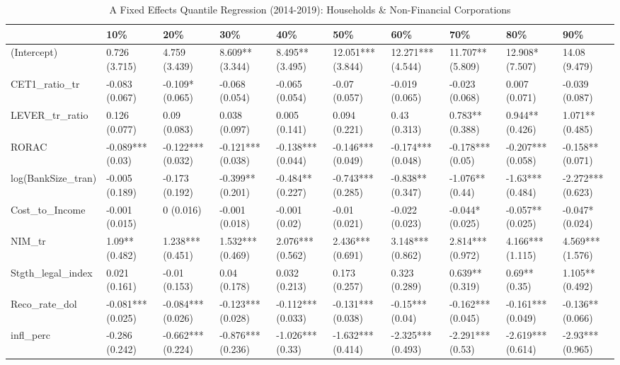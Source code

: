 \begin{table}[ht]
\centering
\caption{A Fixed Effects Quantile Regression (2014-2019): Households & Non-Financial Corporations} 
\begingroup\small
\begin{tabular}{llllllllll}
  \toprule
 & 10\% & 20\% & 30\% & 40\% & 50\% & 60\% & 70\% & 80\% & 90\% \\ 
  \midrule
(Intercept) & 0.726 (3.715) & 4.759 (3.439) & 8.609** (3.344) & 8.495** (3.495) & 12.051*** (3.844) & 12.271*** (4.544) & 11.707** (5.809) & 12.908* (7.507) & 14.08 (9.479) \\ 
  CET1\_ratio\_tr & -0.083 (0.067) & -0.109* (0.065) & -0.068 (0.054) & -0.065 (0.054) & -0.07 (0.057) & -0.019 (0.065) & -0.023 (0.068) & 0.007 (0.071) & -0.039 (0.087) \\ 
  LEVER\_tr\_ratio & 0.126 (0.077) & 0.09 (0.083) & 0.038 (0.097) & 0.005 (0.141) & 0.094 (0.221) & 0.43 (0.313) & 0.783** (0.388) & 0.944** (0.426) & 1.071** (0.485) \\ 
  RORAC & -0.089*** (0.03) & -0.122*** (0.032) & -0.121*** (0.038) & -0.138*** (0.044) & -0.146*** (0.049) & -0.174*** (0.048) & -0.178*** (0.05) & -0.207*** (0.058) & -0.158** (0.071) \\ 
  log(BankSize\_tran) & -0.005 (0.189) & -0.173 (0.192) & -0.399** (0.201) & -0.484** (0.227) & -0.743*** (0.285) & -0.838** (0.347) & -1.076** (0.44) & -1.63*** (0.484) & -2.272*** (0.623) \\ 
  Cost\_to\_Income & -0.001 (0.015) & 0 (0.016) & -0.001 (0.018) & -0.001 (0.02) & -0.01 (0.021) & -0.022 (0.023) & -0.044* (0.025) & -0.057** (0.025) & -0.047* (0.024) \\ 
  NIM\_tr & 1.09** (0.482) & 1.238*** (0.451) & 1.532*** (0.469) & 2.076*** (0.562) & 2.436*** (0.691) & 3.148*** (0.862) & 2.814*** (0.972) & 4.166*** (1.115) & 4.569*** (1.576) \\ 
  Stgth\_legal\_index & 0.021 (0.161) & -0.01 (0.153) & 0.04 (0.178) & 0.032 (0.213) & 0.173 (0.257) & 0.323 (0.289) & 0.639** (0.319) & 0.69** (0.35) & 1.105** (0.492) \\ 
  Reco\_rate\_dol & -0.081*** (0.025) & -0.084*** (0.026) & -0.123*** (0.028) & -0.112*** (0.033) & -0.131*** (0.038) & -0.15*** (0.04) & -0.162*** (0.045) & -0.161*** (0.049) & -0.136** (0.066) \\ 
  infl\_perc & -0.286 (0.242) & -0.662*** (0.224) & -0.876*** (0.236) & -1.026*** (0.33) & -1.632*** (0.414) & -2.325*** (0.493) & -2.291*** (0.53) & -2.619*** (0.614) & -2.93*** (0.965) \\ 

\end{tabular}
\end{table}

